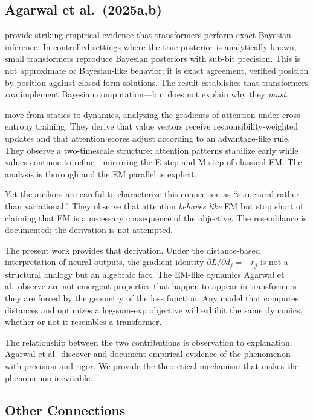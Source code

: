 \subsection{Agarwal et al.\ (2025a,b)}

\citet{agarwal2025geometry} provide striking empirical evidence that transformers perform exact Bayesian inference. In controlled settings where the true posterior is analytically known, small transformers reproduce Bayesian posteriors with sub-bit precision. This is not approximate or Bayesian-like behavior; it is exact agreement, verified position by position against closed-form solutions. The result establishes that transformers \emph{can} implement Bayesian computation---but does not explain why they \emph{must}.

\citet{agarwal2025gradient} move from statics to dynamics, analyzing the gradients of attention under cross-entropy training. They derive that value vectors receive responsibility-weighted updates and that attention scores adjust according to an advantage-like rule. They observe a two-timescale structure: attention patterns stabilize early while values continue to refine---mirroring the E-step and M-step of classical EM. The analysis is thorough and the EM parallel is explicit.

Yet the authors are careful to characterize this connection as ``structural rather than variational.'' They observe that attention \emph{behaves like} EM but stop short of claiming that EM is a necessary consequence of the objective. The resemblance is documented; the derivation is not attempted.

The present work provides that derivation. Under the distance-based interpretation of neural outputs, the gradient identity $\partial L / \partial d_j = -r_j$ is not a structural analogy but an algebraic fact. The EM-like dynamics Agarwal et al.\ observe are not emergent properties that happen to appear in transformers---they are forced by the geometry of the loss function. Any model that computes distances and optimizes a log-sum-exp objective will exhibit the same dynamics, whether or not it resembles a transformer.

The relationship between the two contributions is observation to explanation. Agarwal et al.\ discover and document empirical evidence of the phenomenon with precision and rigor. We provide the theoretical mechanism that makes the phenomenon inevitable.

\subsection{Other Connections}

